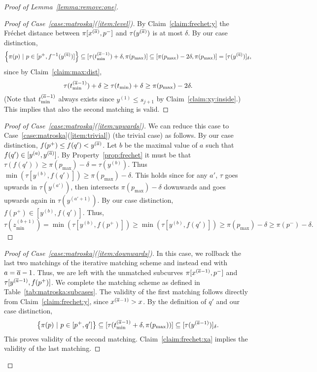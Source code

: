 \documentclass[11pt, letter]{article}
\newcommand{\lemref}[1]{Lemma~\ref{lemma:#1}}
\newcommand{\tabref}[1]{Table~\ref{tab:#1}}
\newcommand{\caseref}[1]{Case~\ref{case:#1}}
\newcommand{\claimref}[1]{Claim~\ref{claim:#1}}
\newcommand{\propref}[1]{Property~\ref{prop:#1}}
\newcommand{\Frechet}{Fr\'echet\xspace}
\providecommand{\brc}[1]{\left\{ {#1} \right\}}
\newcommand{\setSubC}[4]{\ensuremath{\brc{ #1(#2) ~|~ #2 \in [#3,#4]} }}
\newcommand{\range}[2]{\ensuremath{[#1]_{#2}}}
\newcommand{\minSubC}[4]{\ensuremath{\min( #1[#3,#4])}}
\begin{document}
\begin{proof}[Proof of \lemref{remove:one}]
\begin{proof}[Proof of \caseref{matroska}(\ref{item:level})]


By \claimref{frechet:y} the \Frechet distance between $\pi[x^{(\overline{a})},p^{-}]$ and
$\tau(y^{(\overline{a})})$ is at most $\delta$.
By our case distinction,  
\[\setSubC{\pi}{p}{p^{+}}{f^{-1}(y^{(\Astop)})} 
\subseteq [\tau(t_{\min}^{(\Astop-1)})+\delta, \pi(p_{\max})] 
\subseteq [\pi(p_{\max}) -2\delta, \pi(p_{\max})] 
= \range{\tau(y^{(\Astop)})}{\delta},\] 
since by \claimref{max:dist},
\[\tau(t_{\min}^{(\overline{a}-1)})+\delta \geq \tau(t_{\min})+\delta \geq
\pi(p_{\max}) -2\delta. \]
(Note that $t_{\min}^{(\overline{a}-1)}$ always exists since $y^{(1)} \leq s_{j+1}$ by
\claimref{xy:inside}.) 
This implies that also the second matching is valid.
\end{proof}

\begin{proof}[Proof of \caseref{matroska}(\ref{item:upwards})]
We can reduce this case to \caseref{matroska}(\ref{item:trivial}) (the trivial case) as
follows.
By our case distinction,  $f(p^{+}) \leq f(q') < y^{(\overline{a})}$. Let $b$ be the
maximal value of $a$ such that $f(q') \in [y^{(a)}, y^{(\overline{a})}]$.
By \propref{frechet} 
it must be that $\tau(f(q')) \geq \pi(p_{\max}) - \delta =
\tau(y^{(b)})$. Thus $\min(\tau[y^{(b)},f(q')])\geq \pi(p_{\max})-\delta$. This holds since for any $a'$, $\tau$ goes upwards in $\tau(y^{(a')})$, then intersects $\pi(p_{\max})-\delta$ downwards and goes upwards again in $\tau(y^{(a'+1)})$. By our case distinction, $f(p^{+}) \in [y^{(b)},
f(q')]$. Thus, 
\[ \tau(z_{\min}^{(b+1)}) = \minSubC{\tau}{t}{y^{(b)}}{f(p^{+})} \geq \minSubC{\tau}{t}{y^{(b)}}{f(q')} \geq \pi(p_{\max}) - \delta\geq \pi(p^-) - \delta.\]
\end{proof}

\begin{proof}[Proof of \caseref{matroska}(\ref{item:downwards})]
In this case, we rollback the last two matchings of the iterative matching
scheme and instead end with $a=\overline{a}-1$. Thus, we are left with the 
unmatched subcurves $\pi[x^{(\overline{a}-1)}, p^{-}]$ and $\tau[y^{(\overline{a}-1)}, f(p^{+})]$.  
We complete the matching scheme as defined in \tabref{matroska:subcases}.
The validity of the first matching follows directly from
\claimref{frechet:y}, since $x^{(\overline{a}-1)} > x$.
By the definition of $q'$ and our case distinction, 
\[\setSubC{\pi}{p}{p^{+}}{q'} \subseteq [\tau(t_{\min}^{(\Astop-1)}
+\delta, \pi(p_{\max}))] \subseteq \range{\tau(y^{(\Astop-1)})}{\delta}. \]
This proves validity of the second matching.
\claimref{frechet:xa} implies the validity of the last matching.
\end{proof}


\end{proof}
\end{document}
